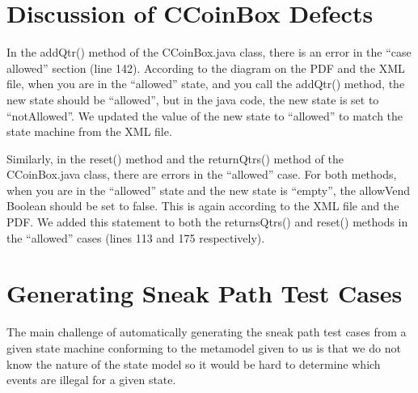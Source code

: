 \documentclass[11pt, a4paper]{article}
\begin{document}
\section{Discussion of CCoinBox Defects}
In the addQtr() method of the CCoinBox.java class, there is an error in the “case allowed” section (line 142). According to the diagram on the PDF and the XML file, when you are in the “allowed” state, and you call the addQtr() method, the new state should be “allowed”, but in the java code, the new state is set to “notAllowed”. We updated the value of the new state to “allowed” to match the state machine from the XML file. 

Similarly, in the reset() method and the returnQtrs() method of the CCoinBox.java class, there are errors in the “allowed” case. For both methods, when you are in the “allowed” state and the new state is “empty”, the allowVend Boolean should be set to false. This is again according to the XML file and the PDF. We added this statement to both the returnsQtrs() and reset() methods in the “allowed” cases (lines 113 and 175 respectively). 

\section{Generating Sneak Path Test Cases}
The main challenge of automatically generating the sneak path test cases from a given state machine conforming to the metamodel given to us is that we do not know the nature of the state model so it would be hard to determine which events are illegal for a given state. 
\end{document}
